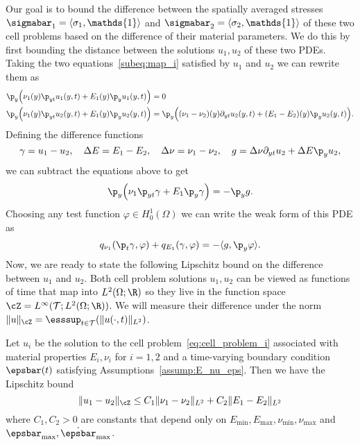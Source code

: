 \documentclass[letterpaper,11pt]{article}
\begin{document}
Our goal is to bound the difference between the spatially averaged stresses $\sigmabar_1 = \langle\sigma_1, \mathds{1}\rangle$ and $\sigmabar_2 = \langle\sigma_2, \mathds{1}\rangle$ of these two cell problems based on the difference of their material parameters. We do this by first bounding the distance between the solutions $u_1, u_2$ of these two PDEs. Taking the two equations~\eqref{subeq:map_i} satisfied by $u_1$ and $u_2$ we can rewrite them as
\begin{align*}
\p_y\Big(\nu_1(y)\p_{yt}u_1(y, t) + E_1(y)\p_y u_1(y, t)\Big) &= 0\\
\p_y\Big(\nu_1(y)\p_{yt}u_2(y, t) + E_1(y)\p_y u_2(y, t)\Big) &= \p_y\Big((\nu_1 - \nu_2)(y)\partial_{yt}u_2(y, t) + (E_1 - E_2)(y)\p_y u_2(y, t)\Big).
\end{align*}
Defining the difference functions
\begin{equation}
    \gamma = u_1 - u_2, \quad \Delta E = E_1 - E_2, \quad \Delta\nu = \nu_1 - \nu_2, \quad g = \Delta\nu\partial_{yt}u_2 + \Delta E\p_yu_2,
\end{equation}
we can subtract the equations above to get
\begin{align*}
    \p_y\Big(\nu_1\p_{yt}\gamma + E_1\p_y\gamma\Big) = -\p_yg.
\end{align*}
Choosing any test function $\varphi \in H_0^1(\Omega)$ we can write the weak form of this PDE as
\begin{equation}\label{eq:gamma_weak}
    q_{\nu_1}(\p_t\gamma, \varphi) + q_{E_1}(\gamma, \varphi) = -\langle g, \p_y\varphi\rangle.
\end{equation}
Now, we are ready to state the following Lipschitz bound on the difference between $u_1$ and $u_2$. Both cell problem solutions $u_1, u_2$ can be viewed as functions of time that map into $L^2(\Omega; \R)$ so they live in the function space $\cZ = L^\infty(\mathcal{T}; L^2(\Omega; \R))$. We will measure their difference under the norm $\|u\|_\cZ = \esssup_{t \in \mathcal{T}}(\|u(\cdot, t)\|_{L^2})$.

\begin{lemma}\label{lem:u1_u2}
Let $u_i$ be the solution to the cell problem~\eqref{eq:cell_problem_i} associated with material properties $E_i, \nu_i$ for $i = 1, 2$ and a time-varying boundary condition $\epsbar(t)$ satisfying Assumptions~\ref{assump:E_nu_eps}. Then we have the Lipschitz bound
\begin{equation}
    \|u_1 - u_2\|_\cZ \leq C_1\|\nu_1 - \nu_2\|_{L^2} + C_2\|E_1 - E_2\|_{L^2}
\end{equation}
where $C_1, C_2 > 0$ are constants that depend only on $E_{\min}, E_{\max}, \nu_{\min}, \nu_{\max}$ and $\epsbar_{\max}, \dot{\epsbar}_{\max}$.
\end{lemma}
\end{document}
